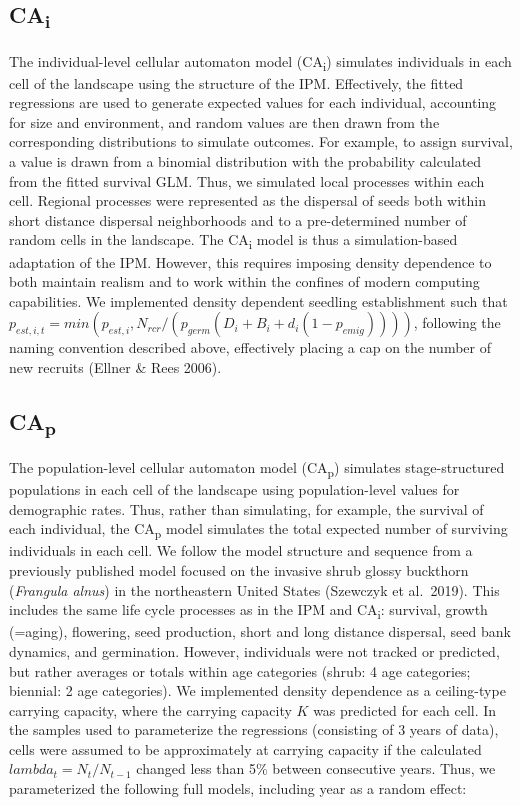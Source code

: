 \documentclass[]{article}
\begin{document}
\subsection{CA\textsubscript{i}}

The individual-level cellular automaton model (CA\textsubscript{i})
simulates individuals in each cell of the landscape using the structure
of the IPM. Effectively, the fitted regressions are used to generate
expected values for each individual, accounting for size and
environment, and random values are then drawn from the corresponding
distributions to simulate outcomes. For example, to assign survival, a
value is drawn from a binomial distribution with the probability
calculated from the fitted survival GLM. Thus, we simulated local
processes within each cell. Regional processes were represented as the
dispersal of seeds both within short distance dispersal neighborhoods
and to a pre-determined number of random cells in the landscape. The
CA\textsubscript{i} model is thus a simulation-based adaptation of the
IPM. However, this requires imposing density dependence to both maintain
realism and to work within the confines of modern computing
capabilities. We implemented density dependent seedling establishment
such that
\(p_{est,i,t} = min(p_{est,i}, N_{rcr}/(p_{germ}(D_i+B_i+d_i(1-p_{emig}))))\),
following the naming convention described above, effectively placing a
cap on the number of new recruits (Ellner \& Rees 2006).

\subsection{CA\textsubscript{p}}

The population-level cellular automaton model (CA\textsubscript{p})
simulates stage-structured populations in each cell of the landscape
using population-level values for demographic rates. Thus, rather than
simulating, for example, the survival of each individual, the
CA\textsubscript{p} model simulates the total expected number of
surviving individuals in each cell. We follow the model structure and
sequence from a previously published model focused on the invasive shrub
glossy buckthorn (\emph{Frangula alnus}) in the northeastern United
States (Szewczyk et al.~2019). This includes the same life cycle
processes as in the IPM and CA\textsubscript{i}: survival, growth
(=aging), flowering, seed production, short and long distance dispersal,
seed bank dynamics, and germination. However, individuals were not
tracked or predicted, but rather averages or totals within age
categories (shrub: 4 age categories; biennial: 2 age categories). We
implemented density dependence as a ceiling-type carrying capacity,
where the carrying capacity \(K\) was predicted for each cell. In the
samples used to parameterize the regressions (consisting of 3 years of
data), cells were assumed to be approximately at carrying capacity if
the calculated \(lambda_t = N_t/N_{t-1}\) changed less than 5\% between
consecutive years. Thus, we parameterized the following full models,
including year as a random effect:
\end{document}
